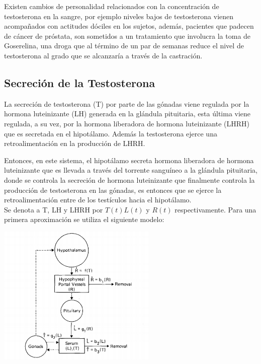 \documentclass[letter,11pt]{article}
\begin{document}
Existen cambios de personalidad relacionados con la concentración de testosterona en la sangre, por ejemplo niveles bajos de testosterona vienen acompañados con actitudes dóciles en los sujetos, además, pacientes que padecen de cáncer de próstata, son sometidos a un tratamiento que involucra la toma de Goserelina, una droga que al término de un par de semanas reduce el nivel de testosterona al grado que se alcanzaría a través de la castración. 

\subsection{Secreción de la Testosterona}

La secreción de testosterona (T) por parte de las gónadas viene regulada por la hormona luteinizante (LH) generada en la glándula pituitaria, esta última viene regulada, a su vez, por la hormona liberadora de hormona luteinizante (LHRH) que es secretada en el hipotálamo. Además la testosterona ejerce una retroalimentación en la producción de LHRH. 

Entonces, en este sistema, el hipotálamo secreta hormona liberadora de hormona luteinizante que es llevada a través del torrente sanguíneo a la glándula pituitaria, donde se controla la secreción de hormona luteinizante que finalmente controla la producción de testosterona en las gónadas, es entonces que se ejerce la retroalimentación entre de los testículos hacia el hipotálamo.\\

Se denota a T, LH y LHRH por $T(t) L(t)$ y $R(t)$ respectivamente. Para una primera aproximación se utiliza el siguiente modelo:

\begin{center}
 \includegraphics[width=3in]{imagenes/Diagramas/diagram2.png}
\end{center}
\end{document}
